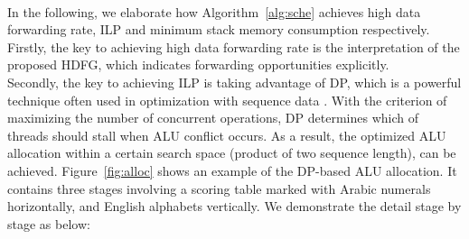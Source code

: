 \\\indent
In the following, we elaborate how Algorithm~\ref{alg:sche} achieves high data forwarding rate, ILP and minimum stack memory consumption respectively.
Firstly, the key to achieving high data forwarding rate is the interpretation of the proposed HDFG, 
which indicates forwarding opportunities explicitly.
\\\indent
Secondly, the key to achieving ILP is taking advantage of DP, which is a powerful technique often used in optimization with sequence data \cite{dpseq}.
With the criterion of maximizing the number of concurrent operations, DP determines which of threads should stall when ALU conflict occurs.
As a result, the optimized ALU allocation within a certain search space (product of two sequence length), can be achieved.
Figure~\ref{fig:alloc} shows an example of the DP-based ALU allocation.
It contains three stages involving a scoring table marked with Arabic numerals horizontally, and English alphabets vertically.
We demonstrate the detail stage by stage as below:
